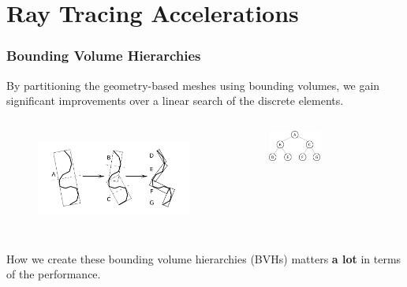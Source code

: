 \documentclass[12pt]{beamer}
\begin{document}
\section{Ray Tracing Accelerations} %


\begin{frame}
\frametitle{Bounding Volume Hierarchies}


By partitioning the geometry-based meshes using bounding volumes, we gain significant improvements over a linear search of the discrete elements.
\begin{columns}
  \begin{figure}
    \centering
    \includegraphics[width=1.1\textwidth]{./images/bvh_2d_ex_w_labels.png} 
    \cite{gottschalk1996obbtree}
  \end{figure}
  
  \begin{figure}
    \centering
    \includegraphics[width=0.5\textwidth]{./images/binary_graph.png}
  \end{figure}
\end{columns}

How we create these bounding volume hierarchies (BVHs) matters \textbf{a lot} in terms of the performance.


\end{frame}
\end{document}

